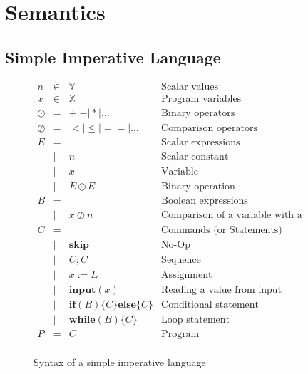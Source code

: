 
\chapter{Semantics}

\section{Simple Imperative Language}
\label{sec:simple-language}


\begin{figure}[h]
  \begin{math}
    \begin{array}{lcll}
      n & \in & \mathbb{V} & \text{Scalar values}\\
      x & \in & \mathbb{X} & \text{Program variables}\\
      \odot & = & + | - | * | \dots & \text{Binary operators}\\
      \oslash & = & < | \leq | == | \dots & \text{Comparison operators}\\
      E & = & & \text{Scalar expressions}\\
        & | & n & \text{Scalar constant}\\
        & | & x & \text{Variable}\\
        & | & E \odot E & \text{Binary operation}\\
      B & = & & \text{Boolean expressions}\\
        & | & x \oslash n & \text{Comparison of a variable with a constant}\\
      C & = & & \text{Commands (or Statements)}\\
        & | &\mathbf{skip} & \text{No-Op}\\
        & | & C; C & \text{Sequence}\\
        & | & x := E & \text{Assignment}\\
        & | & \mathbf{input}(x) & \text{Reading a value from input}\\
        & | & \mathbf{if}(B)\{C\} \mathbf{else} \{C\} & \text{Conditional statement}\\
        & | & \mathbf{while}(B)\{C\} & \text{Loop statement}\\
      P & = & C & \text{Program}\\
    \end{array}
  \end{math}

  \caption{Syntax of a simple imperative language}
  \label{fig:syntax}
\end{figure}